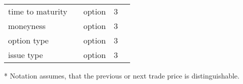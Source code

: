 \begin{threeparttable}
\begin{tabular}{@{}lllll@{}}
        time to maturity        &                                                                                                  & option               & 3           \\
        moneyness               &                                                                                                  & option               & 3           \\
        option type             &                                                                                                  & option               & 3           \\
        issue type              &                                                                                                  & option               & 3           \\ \bottomrule
    \end{tabular}
    \begin{tablenotes}\footnotesize
        \item[*] Notation assumes, that the previous or next trade price is distinguishable.
    \end{tablenotes}
\end{threeparttable}